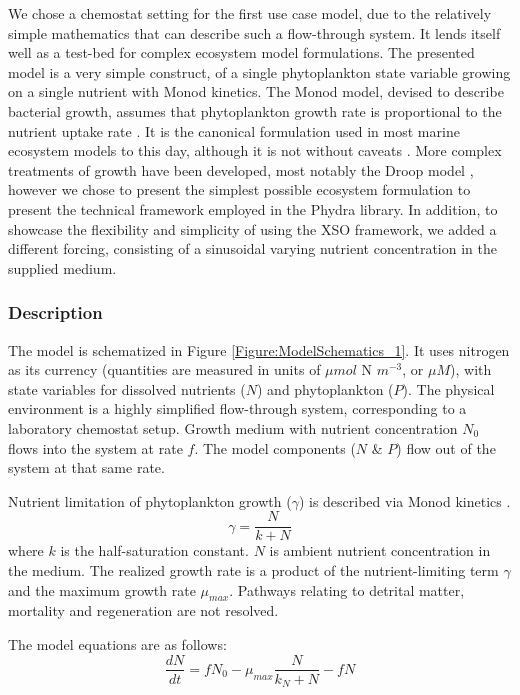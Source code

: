 \documentclass[journal abbreviation, manuscript]{copernicus}
\begin{document}
We chose a chemostat setting for the first use case model, due to the relatively simple mathematics that can describe such a flow-through system. It lends itself well as a test-bed for complex ecosystem model formulations. The presented model is a very simple construct, of a single phytoplankton state variable growing on a single nutrient with Monod kinetics. The Monod model, devised to describe bacterial growth, assumes that phytoplankton growth rate is proportional to the nutrient uptake rate \citep{Monod1942RecherchesBacteriennes}.
It is the canonical formulation used in most marine ecosystem models to this day, although it is not without caveats \citep{Hellweger2017a}. More complex treatments of growth have been developed, most notably the Droop model \citep[e.g.,][]{Droop1968VitaminLutheri}, however we chose to present the simplest possible ecosystem formulation to present the technical framework employed in the Phydra library. In addition, to showcase the flexibility and simplicity of using the XSO framework, we added a different forcing, consisting of a sinusoidal varying nutrient concentration in the supplied medium.

\subsubsection{Description}
The model is schematized in Figure \ref{Figure:ModelSchematics_1}. It uses nitrogen as its currency (quantities are measured in units of $\mu mol$ N $m^{-3}$, or $\mu M$), with state variables for dissolved nutrients ($N$) and phytoplankton ($P$). The physical environment is a highly simplified flow-through system, corresponding to a laboratory chemostat setup. Growth medium with nutrient concentration $N_0$ flows into the system at rate $f$. The model components ($N$ \& $P$) flow out of the system at that same rate.

Nutrient limitation of phytoplankton growth ($\gamma$) is described via Monod kinetics \citep{Monod1942RecherchesBacteriennes}.
\begin{equation}
    \gamma = \frac{N}{k + N} 
\end{equation}
where $k$ is the half-saturation constant. $N$ is ambient nutrient concentration in the medium.
The realized growth rate is a product of the nutrient-limiting term $\gamma$ and the maximum growth rate $\mu_{max}$.
Pathways relating to detrital matter, mortality and regeneration are not resolved. 

The model equations are as follows:
\begin{equation}
    \frac{d N}{d t} = 
    f N_0 %
    -  \mu_{max} \frac{N}{k_N + N} 
    - f N
\end{equation}
\end{document}
